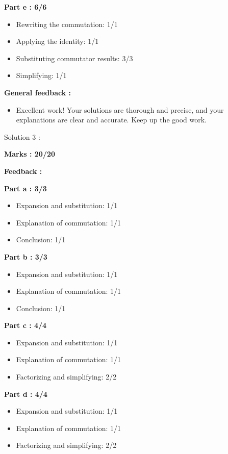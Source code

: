 \documentclass[a4paper,11pt]{article}
\begin{document}
\textbf{Part e : 6/6}

\begin{itemize}
    \item Rewriting the commutation: 1/1
    \item Applying the identity: 1/1
    \item Substituting commutator results: 3/3
    \item Simplifying: 1/1
\end{itemize}


\textbf{General feedback :}

\begin{itemize}
    \item Excellent work! Your solutions are thorough and precise, and your explanations are clear and accurate. Keep up the good work.
\end{itemize}




Solution 3 :

\textbf{Marks : 20/20}

\textbf{Feedback :}

\textbf{Part a : 3/3}

\begin{itemize}
    \item Expansion and substitution: 1/1
    \item Explanation of commutation: 1/1
    \item Conclusion: 1/1
\end{itemize}


\textbf{Part b : 3/3}

\begin{itemize}
    \item Expansion and substitution: 1/1
    \item Explanation of commutation: 1/1
    \item Conclusion: 1/1
\end{itemize}


\textbf{Part c : 4/4}

\begin{itemize}
    \item Expansion and substitution: 1/1
    \item Explanation of commutation: 1/1
    \item Factorizing and simplifying: 2/2
\end{itemize}


\textbf{Part d : 4/4}

\begin{itemize}
    \item Expansion and substitution: 1/1
    \item Explanation of commutation: 1/1
    \item Factorizing and simplifying: 2/2
\end{itemize}
\end{document}

